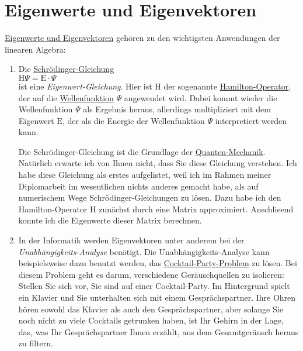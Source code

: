 \chapter{Eigenwerte und Eigenvektoren \label{chapter:eigenwerte}}
\href{https://de.wikipedia.org/wiki/Eigenwertproblem}{Eigenwerte und Eigenvektoren} geh\"oren zu den
wichtigsten Anwendungen der linearen Algebra: 
\begin{enumerate}
\item Die \href{http://de.wikipedia.org/wiki/Schr\"odingergleichung}{Schr\"odinger-Gleichung}
      \\[0.2cm]
      \hspace*{1.3cm}
      $\mathrm{H} \Psi = \mathrm{E} \cdot \Psi$
      \\[0.2cm]
      ist eine {\emph{\color{blue}Eigenwert-Gleichung}}.  Hier ist $\mathrm{H}$ der sogenannte
      \href{http://de.wikipedia.org/wiki/Hamilton-Operator}{Hamilton-Operator}, der auf die
      \href{http://de.wikipedia.org/wiki/Wellenfunktion}{Wellenfunktion} $\Psi$ angewendet wird.
      Dabei kommt wieder die Wellenfunktion $\Psi$ als Ergebnis heraus, allerdings multipliziert mit
      dem Eigenwert $\mathrm{E}$, der als die Energie der Wellenfunktion $\Psi$ interpretiert werden kann.

      Die Schr\"odinger-Gleichung ist die Grundlage der \href{http://de.wikipedia.org/wiki/Quantenmechanik}{Quanten-Mechanik}.
      Nat\"urlich erwarte ich von Ihnen nicht, dass Sie diese Gleichung verstehen.  Ich habe diese
      Gleichung als erstes aufgelistet,  weil ich im Rahmen meiner Diplomarbeit im
      wesentlichen nichts anderes gemacht habe, als auf numerischem Wege Schr\"odinger-Gleichungen zu
      l\"osen.  Dazu habe ich den Hamilton-Operator $\mathrm{H}$ zun\"achst durch eine Matrix
      approximiert.  Anschlie\3end konnte ich die Eigenwerte dieser Matrix berechnen.  
\item In der Informatik werden Eigenvektoren unter anderem bei der 
      {\emph{\color{blue}Unabh\"angigkeits-Analyse}} ben\"otigt.  Die Unabh\"angigkeits-Analyse
      kann beispielsweise dazu benutzt werden, das
      \href{http://research.ics.aalto.fi/ica/cocktail/cocktail_en.cgi}{Cocktail-Party-Problem} zu l\"osen.
      Bei diesem Problem geht es darum, verschiedene Ger\"auschquellen zu isolieren:  Stellen
      Sie sich vor, Sie sind auf einer Cocktail-Party.  Im Hintergrund spielt ein Klavier und Sie
      unterhalten sich mit einem Gespr\"achspartner.  Ihre Ohren h\"oren sowohl das Klavier als auch den
      Gespr\"achspartner, aber solange Sie noch nicht zu viele Cocktails getrunken haben, ist Ihr
      Gehirn in der Lage, das, was Ihr Gespr\"achspartner Ihnen erz\"ahlt, aus 
      dem Gesamtger\"ausch heraus zu filtern.  


\end{enumerate}

